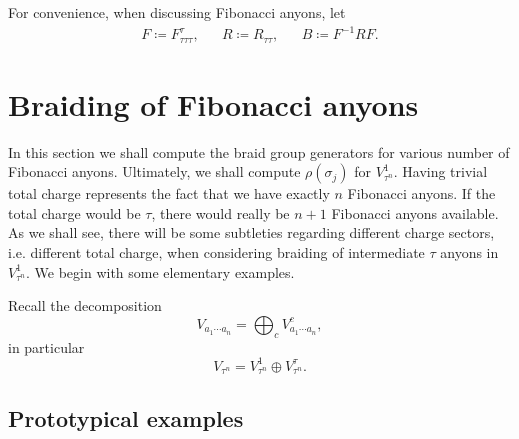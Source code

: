 \documentclass[a4paper,10pt,oneside]{book}
\theoremstyle{plain}
\theoremstyle{definition}
\theoremstyle{remark}
\begin{document}
For convenience, when discussing Fibonacci anyons, let
\begin{equation}
  \begin{aligned}
    F \coloneqq F_{τττ}^τ, &&
    R \coloneqq R_{ττ}, &&
    B \coloneqq F^{-1} R F.
  \end{aligned}
\end{equation}



\section{Braiding of Fibonacci anyons}

In this section we shall compute the braid group generators for various number of Fibonacci anyons. Ultimately, we shall compute $ρ(σ_j)$ for $V_{τ^n}^1$. Having trivial total charge represents the fact that we have exactly $n$ Fibonacci anyons. If the total charge would be $τ$, there would really be $n+1$ Fibonacci anyons available. As we shall see, there will be some subtleties regarding different charge sectors, i.e. different total charge, when considering braiding of intermediate $τ$ anyons in $V_{τ^n}^1$. We begin with some elementary examples.

Recall the decomposition
\begin{equation}
  V_{a_1\cdots a_n} = \bigoplus_{c} V_{a_1 \cdots a_n}^c,
\end{equation}
in particular
\begin{equation}
  V_{τ^n} = V_{τ^n}^1 \oplus V_{τ^n}^τ.
\end{equation}


\subsection{Prototypical examples}
\end{document}
